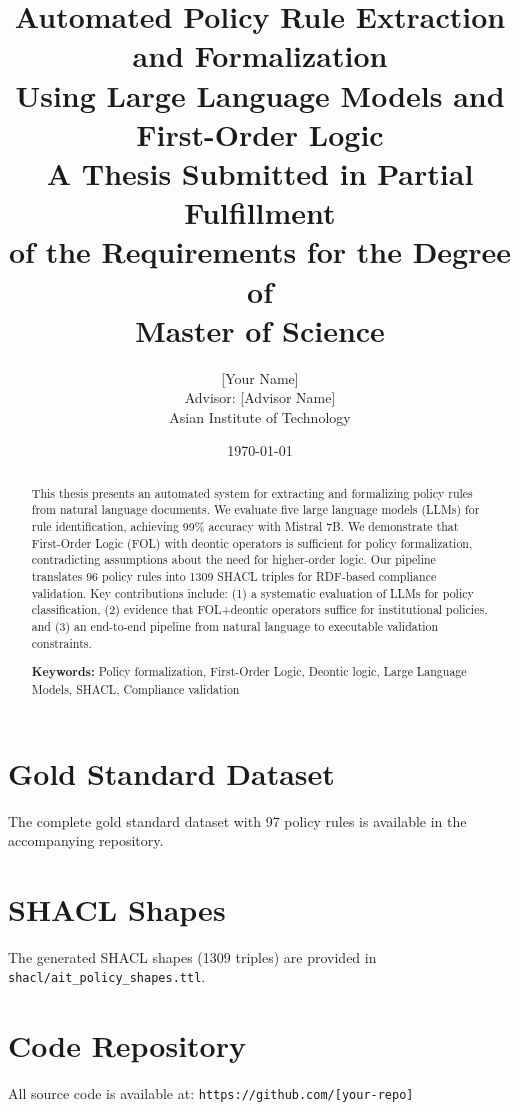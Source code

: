 \documentclass[12pt,a4paper]{report}
\title{
    \textbf{Automated Policy Rule Extraction and Formalization\\
    Using Large Language Models and First-Order Logic}\\[1cm]
    \large A Thesis Submitted in Partial Fulfillment\\
    of the Requirements for the Degree of\\
    Master of Science
}
\author{
    [Your Name]\\[0.5cm]
    \small Advisor: [Advisor Name]\\
    \small Asian Institute of Technology
}
\date{\today}
\begin{document}
\maketitle

\begin{abstract}
This thesis presents an automated system for extracting and formalizing policy rules from natural language documents. We evaluate five large language models (LLMs) for rule identification, achieving 99\% accuracy with Mistral 7B. We demonstrate that First-Order Logic (FOL) with deontic operators is sufficient for policy formalization, contradicting assumptions about the need for higher-order logic. Our pipeline translates 96 policy rules into 1309 SHACL triples for RDF-based compliance validation. Key contributions include: (1) a systematic evaluation of LLMs for policy classification, (2) evidence that FOL+deontic operators suffice for institutional policies, and (3) an end-to-end pipeline from natural language to executable validation constraints.

\textbf{Keywords:} Policy formalization, First-Order Logic, Deontic logic, Large Language Models, SHACL, Compliance validation
\end{abstract}

\tableofcontents
\listoffigures
\listoftables












\appendix
\chapter{Gold Standard Dataset}
The complete gold standard dataset with 97 policy rules is available in the accompanying repository.

\chapter{SHACL Shapes}
The generated SHACL shapes (1309 triples) are provided in \texttt{shacl/ait\_policy\_shapes.ttl}.

\chapter{Code Repository}
All source code is available at: \texttt{https://github.com/[your-repo]}
\end{document}
